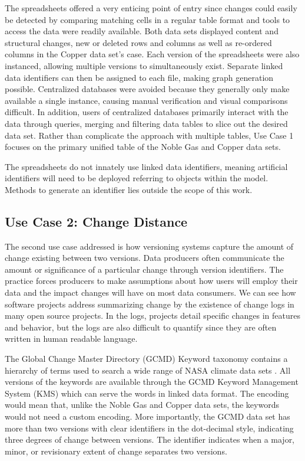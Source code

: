 The spreadsheets offered a very enticing point of entry since changes could easily be detected by comparing matching cells in a regular table format and tools to access the data were readily available.
Both data sets displayed content and structural changes, new or deleted rows and columns as well as re-ordered columns in the Copper data set's case.
Each version of the spreadsheets were also instanced, allowing multiple versions to simultaneously exist.
Separate linked data identifiers can then be assigned to each file, making graph generation possible.
Centralized databases were avoided because they generally only make available a single instance, causing manual verification and visual comparisons difficult.
In addition, users of centralized databases primarily interact with the data through queries, merging and filtering data tables to slice out the desired data set.
Rather than complicate the approach with multiple tables, Use Case 1 focuses on the primary unified table of the Noble Gas and Copper data sets.

The spreadsheets do not innately use linked data identifiers, meaning artificial identifiers will need to be deployed referring to objects within the model.
Methods to generate an identifier lies outside the scope of this work.

\subsection{Use Case 2: Change Distance}

The second use case addressed is how versioning systems capture the amount of change existing between two versions.
Data producers often communicate the amount or significance of a particular change through version identifiers.
The practice forces producers to make assumptions about how users will employ their data and the impact changes will have on most data consumers.
We can see how software projects address summarizing change by the existence of change logs in many open source projects.
In the logs, projects detail specific changes in features and behavior, but the logs are also difficult to quantify since they are often written in human readable language.

The Global Change Master Directory (GCMD) Keyword taxonomy contains a hierarchy of terms used to search a wide range of NASA climate data sets \cite{GCMDKey}.
All versions of the keywords are available through the GCMD Keyword Management System (KMS) which can serve the words in linked data format.
The encoding would mean that, unlike the Noble Gas and Copper data sets, the keywords would not need a custom encoding.
More importantly, the GCMD data set has more than two versions with clear identifiers in the dot-decimal style, indicating three degrees of change between versions.
The identifier indicates when a major, minor, or revisionary extent of change separates two versions.

